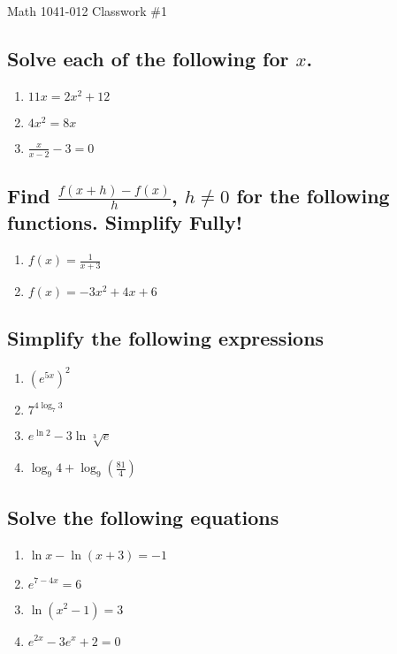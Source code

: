 \documentclass[12pt]{book}
\theoremstyle{definition}
\begin{document}
\begin{center}
{\Large Math 1041-012 \hspace{0.5cm} Classwork \#1}
\end{center}
\vspace{0.2 cm}
\subsection*{Solve each of the following for $x$.}
\begin{enumerate}
\item $11x=2x^2+12$\\[2pt]
\item $4x^2=8x$\\[2pt]
\item $\frac{x}{x-2}-3=0$\\[2pt]
\end{enumerate}
\subsection*{Find $\frac{f(x+h)-f(x)}{h}$, $h\neq 0$ for the following functions. Simplify Fully!}
\begin{enumerate}[resume]
    \item $f(x)=\frac{1}{x+3}$\\[16pt]
    \item $f(x)= -3x^2+4x+6$\\[16pt]
\end{enumerate}
\subsection*{Simplify the following expressions}
\begin{enumerate}[resume]
    \item $(e^{5x})^2$
    \item $7^{4\log_7 3}$
    \item $e^{\ln 2}-3\ln \sqrt[3]{e}$
    \item $\log_9 4+\log_9\left(\frac{81}{4}\right)$
\end{enumerate}
\subsection*{Solve the following equations}
\begin{enumerate}[resume]
    \item $\ln x-\ln(x+3)=-1$\\[4pt]
    \item $e^{7-4x}=6$\\[4pt]
    \item $\ln (x^2-1)=3$\\[4pt]
    \item $e^{2x}-3e^x+2=0$\\[4pt]
\end{enumerate}
\end{document}
